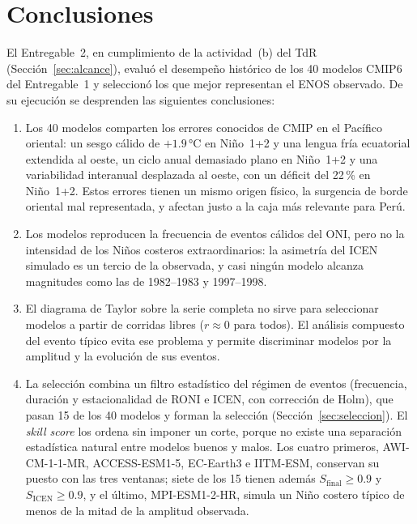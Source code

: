 \documentclass[11pt,a4paper]{article}
\begin{document}
\section{Conclusiones}
\label{sec:conclusiones}

El Entregable~2, en cumplimiento de la actividad~(b) del TdR (Sección~\ref{sec:alcance}), evaluó el desempeño histórico de los 40 modelos CMIP6 del Entregable~1 y seleccionó los que mejor representan el ENOS observado. De su ejecución se desprenden las siguientes conclusiones:

\begin{enumerate}[label=(\roman*)]
\item Los 40 modelos comparten los errores conocidos de CMIP en el Pacífico oriental: un sesgo cálido de $+1.9$\,°C en Niño~1+2 y una lengua fría ecuatorial extendida al oeste, un ciclo anual demasiado plano en Niño~1+2 y una variabilidad interanual desplazada al oeste, con un déficit del 22\,\% en Niño~1+2. Estos errores tienen un mismo origen físico, la surgencia de borde oriental mal representada, y afectan justo a la caja más relevante para Perú.
\item Los modelos reproducen la frecuencia de eventos cálidos del ONI, pero no la intensidad de los Niños costeros extraordinarios: la asimetría del ICEN simulado es un tercio de la observada, y casi ningún modelo alcanza magnitudes como las de 1982--1983 y 1997--1998.
\item El diagrama de Taylor sobre la serie completa no sirve para seleccionar modelos a partir de corridas libres ($r \approx 0$ para todos). El análisis compuesto del evento típico evita ese problema y permite discriminar modelos por la amplitud y la evolución de sus eventos.
\item La selección combina un filtro estadístico del régimen de eventos (frecuencia, duración y estacionalidad de RONI e ICEN, con corrección de Holm), que pasan 15 de los 40 modelos y forman la selección (Sección~\ref{sec:seleccion}). El \emph{skill score} los ordena sin imponer un corte, porque no existe una separación estadística natural entre modelos buenos y malos. Los cuatro primeros, AWI-CM-1-1-MR, ACCESS-ESM1-5, EC-Earth3 e IITM-ESM, conservan su puesto con las tres ventanas; siete de los 15 tienen además $S_{\mathrm{final}} \geq 0.9$ y $S_{\mathrm{ICEN}} \geq 0.9$, y el último, MPI-ESM1-2-HR, simula un Niño costero típico de menos de la mitad de la amplitud observada.
\end{enumerate}
\end{document}

